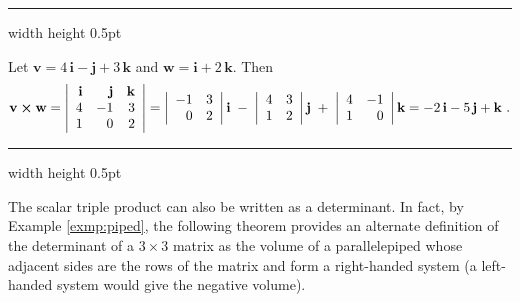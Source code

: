 \vspace{2mm}
\hrule width \textwidth height 0.5pt
\begin{exmp}
 Let $\textbf{v} = 4\,\textbf{i} - \textbf{j} + 3\,\textbf{k}$ and $\textbf{w} = \textbf{i} + 2\,\textbf{k}$. Then
 \begin{displaymath}
  \textbf{v} \bm{\times} \textbf{w} =
  \left|
  \begin{array}{rrr}
   \textbf{i} & \textbf{j} & \textbf{k}\\
   4 & -1 & 3\\
   1 & 0 & 2
  \end{array}\right|
  = \left|\begin{array}{rr} -1 & 3 \\ 0 & 2 \end{array}\right| \textbf{i} \;-\;
  \left|\begin{array}{rr} 4 & 3 \\ 1 & 2 \end{array}\right| \textbf{j} \;+\;
  \left|\begin{array}{rr} 4 & -1 \\ 1 & 0 \end{array}\right| \textbf{k}
  = -2\,\textbf{i} - 5\,\textbf{j} + \textbf{k} ~.
 \end{displaymath}
\end{exmp}
\hrule width \textwidth height 0.5pt
\vspace{2mm}

The scalar triple product can also be written as a determinant. In fact, by Example \ref{exmp:piped}, the following
theorem provides an alternate definition of the determinant of a $3 \times 3$ matrix as the volume
of a parallelepiped whose adjacent sides are the rows of the matrix and form a right-handed system (a
left-handed system would give the negative volume).


